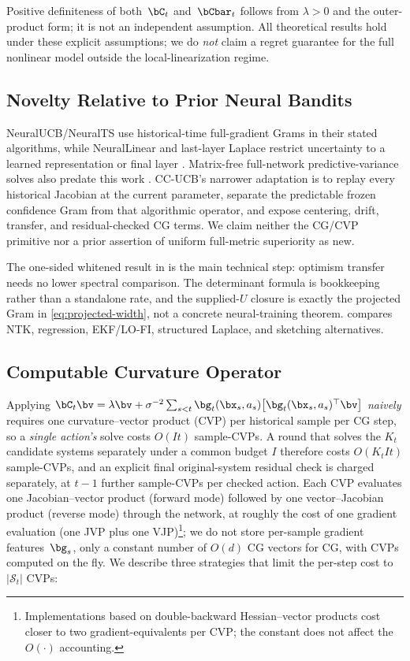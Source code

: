 Positive definiteness of both~$\bC_t$ and~$\bCbar_t$ follows from
$\lambda>0$ and the outer-product form; it is not an independent assumption.
All theoretical results hold under these explicit assumptions; we do
\emph{not} claim a regret guarantee for the full nonlinear model outside
the local-linearization regime.



\subsection{Novelty Relative to Prior Neural Bandits}\label{sec:novelty}

NeuralUCB/NeuralTS use historical-time full-gradient Grams in their stated
algorithms, while NeuralLinear and last-layer Laplace restrict uncertainty to a
learned representation or final layer
\citep{zhou2020neural,zhang2021neural,riquelme2018deep,kristiadi2020being}.
Matrix-free full-network predictive-variance solves also predate this work
\citep{maddox2021fast}.  CC-UCB's narrower adaptation is to replay every
historical Jacobian at the current parameter, separate the predictable frozen
confidence Gram from that algorithmic operator, and expose centering, drift,
transfer, and residual-checked CG terms.  We claim neither the CG/CVP primitive
nor a prior assertion of uniform full-metric superiority as new.

The one-sided whitened result in  is the main technical
step: optimism transfer needs no lower spectral comparison.  The determinant
formula is bookkeeping rather than a standalone rate, and the supplied-$U$
closure is exactly the projected Gram in \eqref{eq:projected-width}, not a
concrete neural-training theorem.   compares NTK, regression,
EKF/LO-FI, structured Laplace, and sketching alternatives.



\subsection{Computable Curvature Operator}\label{sec:curvop}

Applying $\bC_t\bv = \lambda\bv + \sigma^{-2}\sum_{s<t}\bg_t(\bx_s,a_s)\bigl[\bg_t(\bx_s,a_s)^\top\bv\bigr]$
\emph{naively} requires one curvature--vector product (CVP) per historical
sample per CG step, so a \emph{single action's} solve costs $O(It)$
sample-CVPs.  A round that solves the $K_t$ candidate systems separately under a
common budget $I$ therefore costs $O(K_tIt)$ sample-CVPs, and an explicit final
original-system residual check is charged separately, at $t{-}1$ further
sample-CVPs per checked action.
Each CVP evaluates one Jacobian--vector product (forward mode) followed by
one vector--Jacobian product (reverse mode) through the network, at roughly
the cost of one gradient evaluation (one JVP plus one VJP)\footnote{Implementations based on double-backward Hessian--vector
products cost closer to two gradient-equivalents per CVP; the constant
does not affect the $O(\cdot)$ accounting.}; we do not store
per-sample gradient features~$\bg_s$, only a constant number of $O(d)$ CG vectors
for CG, with CVPs computed on the fly.
We describe three strategies that limit the per-step cost to $|\mathcal{S}_t|$
CVPs:

